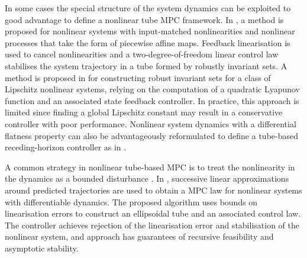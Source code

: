 \documentclass[a4paper, 10 pt, conference]{IEEEconf}
\begin{document}
In some cases the special structure of the system dynamics can be exploited to good advantage to define a nonlinear tube MPC framework. In \cite{rakovic2006simple}, a method is proposed for nonlinear systems with input-matched nonlinearities and nonlinear processes that take the form of piecewise affine maps. Feedback linearisation is used to cancel nonlinearities and a two-degree-of-freedom linear control law stabilises the system trajectory in a tube formed by robustly invariant sets. A method is proposed in \cite{yu2013tube} for constructing robust invariant sets for a class of Lipschitz nonlinear systems, relying on the computation of a quadratic Lyapunov function and an associated state feedback controller. In practice, this approach is limited since finding a global Lipschitz constant may result in a conservative controller with poor performance. Nonlinear system dynamics with a differential flatness property can also be advantageously reformulated to define a tube-based receding-horizon controller as in \cite{petkar2016robust}.

A common strategy in nonlinear tube-based MPC is to treat the nonlinearity in the dynamics as a bounded disturbance \cite{lee2002constrained, althoff2008reachability, cannon2009successive, mark}. In \cite{mark}, successive linear approximations around predicted trajectories are used to obtain a MPC law for nonlinear systems with differentiable dynamics. The proposed algorithm uses bounds on linearisation errors to construct an ellipsoidal tube and an associated control law. The controller achieves rejection of the linearisation error and stabilisation of the nonlinear system, %
and approach has guarantees of recursive feasibility and asymptotic stability.
\end{document}
